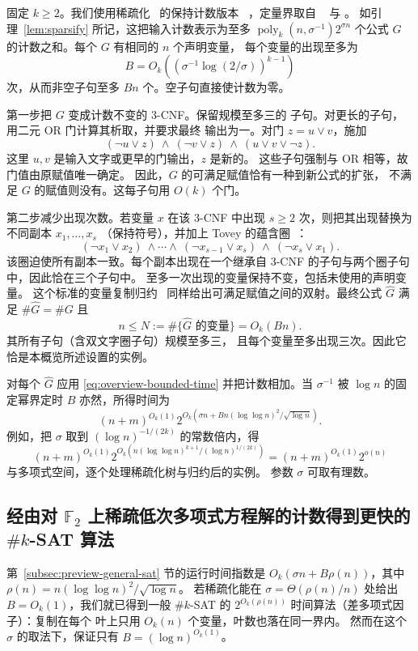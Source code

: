 \documentclass[11pt,reqno]{amsart}
\numberwithin{equation}{section}
\theoremstyle{definition}\newtheorem{definition}[theorem]{定义}
\theoremstyle{remark}\newtheorem{remark}[theorem]{注}
\renewcommand{\le}{\leqslant}
\renewcommand{\ge}{\geqslant}
\begin{document}
固定 $k\ge2$。我们使用稀疏化~\cite{IPZ} 的保持计数版本
~\cite[Appendix~A]{DHMTW}，定量界取自
~\cite[Section~6]{CIP} 与
\cite[Lemma~5.14 and equation~(5.4)]{CalabroThesis}。
如引理~\ref{lem:sparsify} 所记，这把输入计数表示为至多
$\operatorname{poly}_k(n,\sigma^{-1})2^{\sigma n}$ 个公式
$G$ 的计数之和。每个 $G$ 有相同的 $n$ 个声明变量，
每个变量的出现至多为
\[
 B=O_k\!\left((\sigma^{-1}\log(2/\sigma))^{k-1}\right)
\]
次，从而非空子句至多 $Bn$ 个。空子句直接使计数为零。

第一步把 $G$ 变成计数不变的 $3$-CNF。保留规模至多三的
子句。对更长的子句，用二元 OR 门计算其析取，并要求最终
输出为一。对门 $z=u\vee v$，施加
\[
 (\neg u\vee z)\ \wedge\ (\neg v\vee z)\ \wedge\
 (u\vee v\vee\neg z).
\]
这里 $u,v$ 是输入文字或更早的门输出，$z$ 是新的。
这些子句强制与 OR 相等，故门值由原赋值唯一确定。
因此，$G$ 的可满足赋值恰有一种到新公式的扩张，
不满足 $G$ 的赋值则没有。这每子句用 $O(k)$ 个门。

第二步减少出现次数。若变量 $x$ 在该 $3$-CNF 中出现
$s\ge2$ 次，则把其出现替换为不同副本 $x_1,\ldots,x_s$
（保持符号），并加上 Tovey 的蕴含圈~\cite[p.~86]{Tov84}：
\[
 (\neg x_1\vee x_2)\ \wedge\cdots\wedge\
 (\neg x_{s-1}\vee x_s)\ \wedge\ (\neg x_s\vee x_1).
\]
该圈迫使所有副本一致。每个副本出现在一个继承自 $3$-CNF
的子句与两个圈子句中，因此恰在三个子句中。
至多一次出现的变量保持不变，包括未使用的声明变量。
这个标准的变量复制归约~\cite[Proposition~4.7]{Gol08}
同样给出可满足赋值之间的双射。最终公式 $\widehat G$
满足 $\#\widehat G=\#G$ 且
\[
 n\le N:=\#\{\text{$\widehat G$ 的变量}\}=O_k(Bn).
\]
其所有子句（含双文字圈子句）规模至多三，
且每个变量至多出现三次。因此它恰是本概览所述设置的实例。

对每个 $\widehat G$ 应用 \eqref{eq:overview-bounded-time}
并把计数相加。当 $\sigma^{-1}$ 被 $\log n$ 的固定幂界定时
$B$ 亦然，所得时间为
\[
 (n+m)^{O_k(1)}
 2^{O_k\!\left(\sigma n+
          Bn(\log\log n)^2/\sqrt{\log n}\right)}.
\]
例如，把 $\sigma$ 取到 $(\log n)^{-1/(2k)}$ 的常数倍内，得
\[
 (n+m)^{O_k(1)}
 2^{O_k\!\left(n(\log\log n)^{k+1}/(\log n)^{1/(2k)}\right)}
   = (n+m)^{O_k(1)}2^{o(n)}
\]
与多项式空间，逐个处理稀疏化树与归约后的实例。
参数 $\sigma$ 可取有理数。

\subsection{经由对 \texorpdfstring{$\mathbb F_2$}{F\_2} 上稀疏低次多项式方程解的计数得到更快的 \texorpdfstring{$\#k$-SAT}{\#k-SAT} 算法}
\label{subsec:preview-full-case}

第~\ref{subsec:preview-general-sat} 节的运行时间指数是
$O_k(\sigma n+B\rho(n))$，其中
$\rho(n)=n(\log\log n)^2/\sqrt{\log n}$。
若稀疏化能在 $\sigma=\Theta(\rho(n)/n)$ 处给出
$B=O_k(1)$，我们就已得到一般 $\#k$-SAT 的
$2^{O_k(\rho(n))}$ 时间算法（差多项式因子）：复制在每个
叶上只用 $O_k(n)$ 个变量，叶数也落在同一界内。
然而在这个 $\sigma$ 的取法下，保证只有
$B=(\log n)^{O_k(1)}$。
\end{document}
